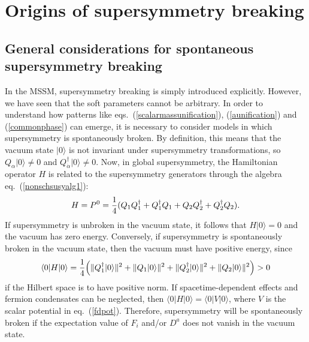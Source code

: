 \documentclass[12pt]{article}
\def\beq{\begin{eqnarray}}
\def\eeq{\end{eqnarray}}
\def\vac{|0\rangle}
\def\antivac{\langle 0|}
\begin{document}
\section{Origins of supersymmetry breaking}\label{sec:origins}
\subsection{General considerations for spontaneous
supersymmetry breaking}\label{subsec:origins.general}
\setcounter{equation}{0}
\setcounter{figure}{0}
\setcounter{table}{0}
\setcounter{footnote}{1}

In the MSSM, supersymmetry breaking is simply introduced explicitly.
However, we have seen that the soft parameters cannot be arbitrary. In
order to understand how patterns like eqs.~(\ref{scalarmassunification}),
(\ref{aunification}) and (\ref{commonphase}) can emerge, it is necessary
to consider models in which supersymmetry is spontaneously broken. By
definition, this means that the vacuum state $\vac$ is not invariant under
supersymmetry transformations, so $Q_\alpha \vac \not= 0$ and
$Q^\dagger_{\dot{\alpha}}\vac \not=0$. Now, in global supersymmetry, the
Hamiltonian operator $H$ is related to the supersymmetry generators
through the algebra eq.~(\ref{nonschsusyalg1}):
\beq
H=P^0 =
{1\over 4}( Q_1 Q_{{1}}^\dagger + Q_{{1}}^\dagger Q_1 
+ Q_2 Q_{{2}}^\dagger + Q_{{2}}^\dagger Q_2 ) .
\eeq
If supersymmetry is unbroken in the vacuum state, it follows that $H\vac =
0$ and the vacuum has zero energy. Conversely, if supersymmetry is
spontaneously broken in the vacuum state, then the vacuum must have
positive energy, since
\beq
\antivac H \vac = {1\over 4} \Bigl (\| Q_1^\dagger \vac \|^2 +
\| Q_{{1}} \vac \|^2
+ \| Q^\dagger_{2} \vac \|^2
+ \| Q_{{2}} \vac \|^2
\Bigr ) > 0
\eeq
if the Hilbert space is to have positive norm. If spacetime-dependent
effects and fermion condensates can be neglected, then $\antivac H\vac =
\antivac V \vac $, where $V$ is the scalar potential in eq.~(\ref{fdpot}).
Therefore, supersymmetry will be spontaneously broken if the 
expectation value of $F_i$ and/or
$D^a$ does not vanish in the vacuum state. 
\end{document}
